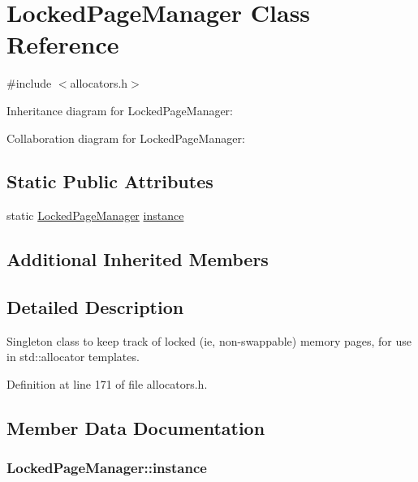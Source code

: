 \hypertarget{class_locked_page_manager}{}\section{Locked\+Page\+Manager Class Reference}
\label{class_locked_page_manager}


{\ttfamily \#include $<$allocators.\+h$>$}



Inheritance diagram for Locked\+Page\+Manager\+:


Collaboration diagram for Locked\+Page\+Manager\+:
\subsection*{Static Public Attributes}
\begin{DoxyCompactItemize}
\item 
static \hyperlink{class_locked_page_manager}{Locked\+Page\+Manager} \hyperlink{class_locked_page_manager_aedd82df65c12c1d83d43ac8500c57fcf}{instance}
\end{DoxyCompactItemize}
\subsection*{Additional Inherited Members}


\subsection{Detailed Description}
Singleton class to keep track of locked (ie, non-\/swappable) memory pages, for use in std\+::allocator templates. 

Definition at line 171 of file allocators.\+h.



\subsection{Member Data Documentation}
\hypertarget{class_locked_page_manager_aedd82df65c12c1d83d43ac8500c57fcf}{}
\subsubsection[{instance}]{ Locked\+Page\+Manager\+::instance\hspace{0.3cm}{\ttfamily [static]}}\label{class_locked_page_manager_aedd82df65c12c1d83d43ac8500c57fcf}


